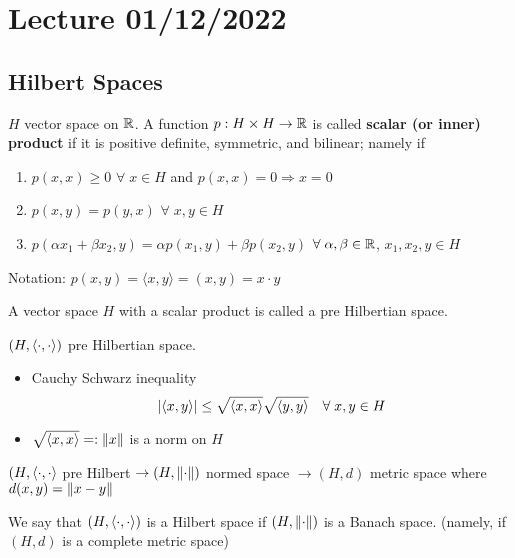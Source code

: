 \section{Lecture 01/12/2022}

\subsection*{Hilbert Spaces}

\begin{definition}
    \(H\) vector space on \(\mathbb{R}\). A function \(p:H \times H \to \mathbb{R}\) is called \textbf{scalar (or inner) product} if it is positive definite, symmetric, and bilinear; namely if 
    \begin{enumerate}
        \item \(p(x, x) \geq 0\) \(\forall \; x \in H\) and \(p(x, x) = 0 \Rightarrow x=0\)
        \item \(p(x, y) = p(y, x)\) \(\forall \; x, y \in H\)
        \item \(p(\alpha x_1 + \beta x_2, y) = \alpha p (x_1, y) + \beta p(x_2, y)\) \(\forall \; \alpha, \beta \in \mathbb{R}\), \(x_1, x_2, y \in H\)
    \end{enumerate}
\end{definition}

Notation: \(p(x, y) = \langle x, y \rangle = (x, y) = x \cdot y\)

\begin{definition}
    A vector space \(H\) with a scalar product is called a pre Hilbertian space.
\end{definition}

\begin{proposition}
    \((H, \langle \cdot,\cdot \rangle )\) pre Hilbertian space.
    \begin{itemize}
        \item Cauchy Schwarz inequality \[
            \abs{\langle x, y\rangle} \leq \sqrt{\langle x, x\rangle} \sqrt{\langle y, y\rangle } \quad \forall \; x, y \in H
        \]
        \item \(\sqrt{\langle x, x \rangle} =: \norm{x}\) is a norm on \(H\)
    \end{itemize}
\end{proposition}

\((H, \langle \cdot,\cdot \rangle \) pre Hilbert \(\to (H, \norm{\cdot})\) normed space \(\to (H, d)\) metric space where \(d(x, y) = \norm{x-y}\)

\begin{definition}
    We say that \((H, \langle \cdot,\cdot \rangle)\) is a Hilbert space if \((H, \norm{\cdot})\) is a Banach space. (namely, if \((H, d)\) is a complete metric space)
\end{definition}

